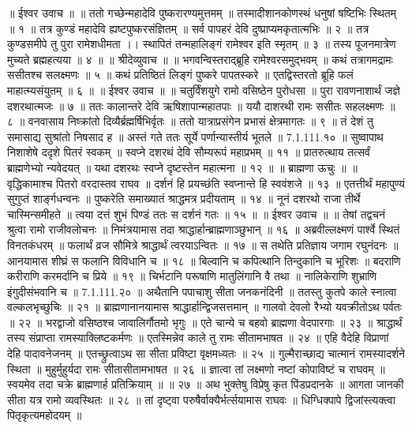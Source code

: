 ॥ ईश्वर उवाच ॥ ॥
ततो गच्छेन्महादेवि पुष्करारण्यमुत्तमम् ॥
तस्मादीशानकोणस्थं धनुषां षष्टिभिः स्थितम् ॥ १ ॥
तत्र कुण्डं महादेवि ह्यष्टपुष्करसंज्ञितम् ॥
सर्व पापहरं देवि दुष्प्राप्यमकृतात्मभिः ॥ २ ॥
तत्र कुण्डसमीपे तु पुरा रामेशधीमता ।।
स्थापितं तन्महालिङ्गं रामेश्वर इति स्मृतम् ॥ ३ ॥
तस्य पूजनमात्रेण मुच्यते ब्रह्महत्यया ॥ ४ ॥
॥ श्रीदेव्युवाच ॥ ॥
भगवन्विस्तराद्ब्रूहि रामेश्वरसमुद्भवम् ॥
कथं तत्रागमद्रामः ससीतश्च सलक्ष्मणः ॥ ५ ॥
कथं प्रतिष्ठितं लिङ्गं पुष्करे पापतस्करे ॥
एतद्विस्तरतो ब्रूहि फलं माहात्म्यसंयुतम् ॥ ६ ॥
॥ ईश्वर उवाच ॥ ॥
चतुर्विंशयुगे रामो वसिष्ठेन पुरोधसा ॥
पुरा रावणनाशार्थं जज्ञे दशरथात्मजः ॥ ७ ॥
ततः कालान्तरे देवि ऋषिशापान्महातपाः ॥
ययौ दाशरथी रामः ससीतः सहलक्ष्मणः ॥ ८ ॥
वनवासाय निष्क्रांतो दिव्यैर्ब्रह्मर्षिभिर्वृतः ॥
ततो यात्राप्रसंगेन प्रभासं क्षेत्रमागतः ॥ ९ ॥
तं देशं तु समासाद्य सुश्रांतो निषसाद ह ॥
अस्तं गते ततः सूर्ये पर्णान्यास्तीर्य भूतले ॥ 7.1.111.१० ॥
सुष्वापाथ निशाशेषे ददृशे पितरं स्वकम् ॥
स्वप्ने दशरथं देवि सौम्यरूपं महाप्रभम् ॥ ११ ॥
प्रातरुत्थाय तत्सर्वं ब्राह्मणेभ्यो न्यवेदयत् ॥
यथा दशरथः स्वप्ने दृष्टस्तेन महात्मना ॥ १२ ॥
॥ ब्राह्मणा ऊचुः ॥ ॥
वृद्धिकामाश्च पितरो वरदास्तव राघव ॥
दर्शनं हि प्रयच्छंति स्वप्नान्ते हि स्ववंशजे ॥ १३ ॥
एतत्तीर्थं महापुण्यं सुगुप्तं शार्ङ्गधन्वनः ॥
पुष्करेति समाख्यातं श्राद्धमत्र प्रदीयताम् ॥ १४ ॥
नूनं दशरथो राजा तीर्थे चास्मिन्समीहते ॥
त्वया दत्तं शुभं पिण्डं ततः स दर्शनं गतः ॥ १५ ॥
॥ ईश्वर उवाच ॥ ॥
तेषां तद्वचनं श्रुत्वा रामो राजीवलोचनः ॥
निमंत्रयामास तदा श्राद्धार्हान्ब्राह्मणाञ्छुभान् ॥ १६ ॥
अब्रवील्लक्ष्मणं पार्श्वे स्थितं विनतकंधरम् ॥
फलार्थं व्रज सौमित्रे श्राद्धार्थं त्वरयाऽन्वितः ॥ १७ ॥
स तथेति प्रतिज्ञाय जगाम रघुनंदनः ॥
आनयामास शीघ्रं स फलानि विविधानि च ॥ १८ ॥
बिल्वानि च कपित्थानि तिन्दुकानि च भूरिशः ॥
बदराणि करीराणि करमर्दानि च प्रिये ॥ १९ ॥
चिर्भटानि परूषाणि मातुलिंगानि वै तथा ॥
नालिकेराणि शुभ्राणि इंगुदीसंभवानि च ॥ 7.1.111.२० ॥
अथैतानि पपाचाशु सीता जनकनंदिनी ॥
ततस्तु कुतपे काले स्नात्वा वल्कलभृच्छुचिः ॥ २१ ॥
ब्राह्मणानानयामास श्राद्धार्हान्द्विजसत्तमान् ॥
गालवो देवलो रैभ्यो यवक्रीतोऽथ पर्वतः ॥ २२ ॥
भरद्वाजो वसिष्ठश्च जावालिर्गौतमो भृगुः ॥
एते चान्ये च बहवो ब्राह्मणा वेदपारगाः ॥ २३ ॥
श्राद्धार्थं तस्य संप्राप्ता रामस्याक्लिष्टकर्मणः ॥
एतस्मिन्नेव काले तु रामः सीतामभाषत ॥ २४ ॥
एहि वैदेहि विप्राणां देहि पादावनेजनम् ॥
एतच्छ्रुत्वाऽथ सा सीता प्रविष्टा वृक्षमध्यतः ॥ २५ ॥
गुल्मैराच्छाद्य चात्मानं रामस्यादर्शने स्थिता ॥
मुहुर्मुहुर्यदा रामः सीतासीतामभाषत ॥ २६ ॥
ज्ञात्वा तां लक्ष्मणो नष्टां कोपाविष्टं च राघवम् ॥
स्वयमेव तदा चक्रे ब्राह्मणार्ह प्रतिक्रियाम् ॥ ॥ २७ ॥
अथ भुक्तेषु विप्रेषु कृत पिंडप्रदानके ॥
आगता जानकी सीता यत्र रामो व्यवस्थितः ॥ २८ ॥
तां दृष्ट्वा परुषैर्वाक्यैर्भर्त्सयामास राघवः ॥
धिग्धिक्पापे द्विजांस्त्यक्त्वा पितृकृत्यमहोदयम् ॥
